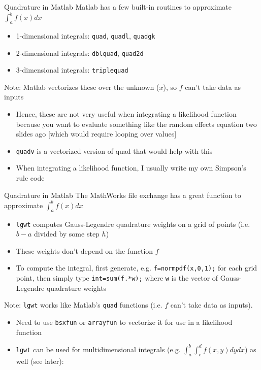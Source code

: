 \documentclass[english,xcolor=dvipsnames]{beamer}
\begin{document}
\begin{frame}{Quadrature in Matlab}
Matlab has a few built-in routines to approximate $\int_a^b f(x)dx$
\begin{itemize}
	\item 1-dimensional integrals: \texttt{quad}, \texttt{quadl}, \texttt{quadgk}
	\item 2-dimensional integrals: \texttt{dblquad}, \texttt{quad2d}
	\item 3-dimensional integrals: \texttt{triplequad}
\end{itemize}
Note: Matlab vectorizes these over the unknown ($x$), so $f$ can't take data as inputs
\begin{itemize}
	\item Hence, these are not very useful when integrating a likelihood function because you want to evaluate something like the random effects equation two slides ago [which would require looping over values]
	\item \texttt{quadv} is a vectorized version of quad that would help with this
	\item When integrating a likelihood function, I usually write my own Simpson's rule code
\end{itemize}
\end{frame}

\begin{frame}{Quadrature in Matlab}
The MathWorks file exchange has a great function to approximate $\int_a^b f(x)dx$
\begin{itemize}
	\item \texttt{lgwt} computes Gauss-Legendre quadrature weights on a grid of points (i.e. $b-a$ divided by some step $h$)
	\item These weights don't depend on the function $f$
	\item To compute the integral, first generate, e.g. \texttt{f=normpdf(x,0,1);} for each grid point, then simply type \texttt{int=sum(f.*w);} where \texttt{w} is the vector of Gauss-Legendre quadrature weights
\end{itemize}
Note: \texttt{lgwt} works like Matlab's \texttt{quad} functions (i.e. $f$ can't take data as inputs). 
\begin{itemize}
	\item Need to use \texttt{bsxfun} or \texttt{arrayfun} to vectorize it for use in a likelihood function
	\item \texttt{lgwt} can be used for multidimensional integrals (e.g. $\int_a^b \int_c^d f(x,y)dydx$) as well (see later):
\end{itemize}
\end{frame}
\end{document}
